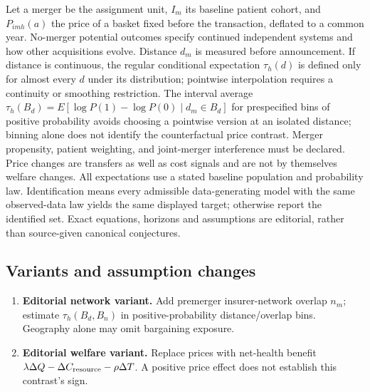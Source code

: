 \documentclass[11pt,a4paper]{article}
\begin{document}
Let a merger be the assignment unit, \(I_m\) its baseline patient cohort, and \(P_{imh}(a)\) the price of a basket fixed before the transaction, deflated to a common year. No-merger potential outcomes specify continued independent systems and how other acquisitions evolve. Distance \(d_m\) is measured before announcement. If distance is continuous, the regular conditional expectation \(\tau_h(d)\) is defined only for almost every \(d\) under its distribution; pointwise interpolation requires a continuity or smoothing restriction. The interval average \(\tau_h(B_d)=E[\log P(1)-\log P(0)\mid d_m\in B_d]\) for prespecified bins of positive probability avoids choosing a pointwise version at an isolated distance; binning alone does not identify the counterfactual price contrast. Merger propensity, patient weighting, and joint-merger interference must be declared. Price changes are transfers as well as cost signals and are not by themselves welfare changes. All expectations use a stated baseline population and probability law. Identification means every admissible data-generating model with the same observed-data law yields the same displayed target; otherwise report the identified set. Exact equations, horizons and assumptions are editorial, rather than source-given canonical conjectures.
\subsection*{Variants and assumption changes}
\begin{enumerate}
\item \textbf{Editorial network variant.} Add premerger insurer-network overlap \(n_m\); estimate \(\tau_h(B_d,B_n)\) in positive-probability distance/overlap bins. Geography alone may omit bargaining exposure.
\item \textbf{Editorial welfare variant.} Replace prices with net-health benefit \(\lambda\Delta Q-\Delta C_{\rm resource}-\rho\Delta T\). A positive price effect does not establish this contrast's sign.
\end{enumerate}
\end{document}
